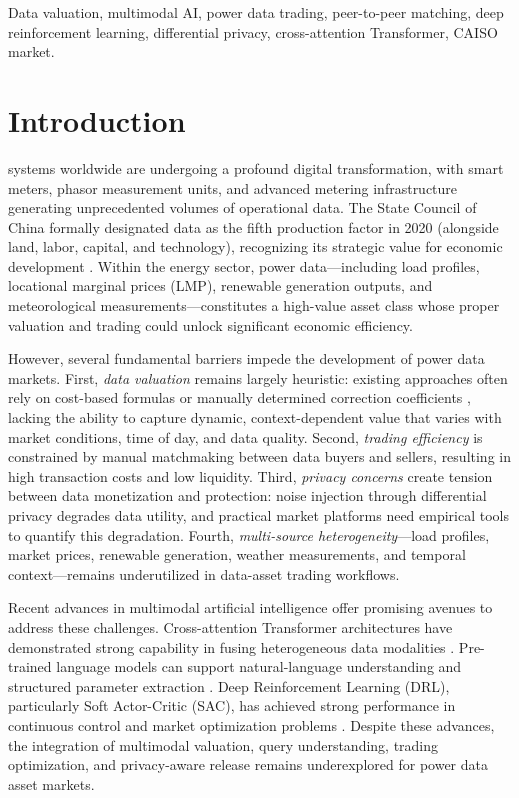 \documentclass{ieeeaccess}
\begin{document}
\begin{keywords}
Data valuation, multimodal AI, power data trading, peer-to-peer matching, deep reinforcement learning, differential privacy, cross-attention Transformer, CAISO market.
\end{keywords}

\titlepgskip=-15pt

\maketitle

\section{Introduction}
\label{sec:introduction}
 systems worldwide are undergoing a profound digital transformation, with smart meters, phasor measurement units, and advanced metering infrastructure generating unprecedented volumes of operational data. The State Council of China formally designated data as the fifth production factor in 2020 (alongside land, labor, capital, and technology), recognizing its strategic value for economic development \cite{b1}. Within the energy sector, power data---including load profiles, locational marginal prices (LMP), renewable generation outputs, and meteorological measurements---constitutes a high-value asset class whose proper valuation and trading could unlock significant economic efficiency.

However, several fundamental barriers impede the development of power data markets. First, \textit{data valuation} remains largely heuristic: existing approaches often rely on cost-based formulas or manually determined correction coefficients \cite{b2}, lacking the ability to capture dynamic, context-dependent value that varies with market conditions, time of day, and data quality. Second, \textit{trading efficiency} is constrained by manual matchmaking between data buyers and sellers, resulting in high transaction costs and low liquidity. Third, \textit{privacy concerns} create tension between data monetization and protection: noise injection through differential privacy degrades data utility, and practical market platforms need empirical tools to quantify this degradation. Fourth, \textit{multi-source heterogeneity}---load profiles, market prices, renewable generation, weather measurements, and temporal context---remains underutilized in data-asset trading workflows.

Recent advances in multimodal artificial intelligence offer promising avenues to address these challenges. Cross-attention Transformer architectures have demonstrated strong capability in fusing heterogeneous data modalities \cite{b3}. Pre-trained language models can support natural-language understanding and structured parameter extraction \cite{b4}. Deep Reinforcement Learning (DRL), particularly Soft Actor-Critic (SAC), has achieved strong performance in continuous control and market optimization problems \cite{b5}. Despite these advances, the integration of multimodal valuation, query understanding, trading optimization, and privacy-aware release remains underexplored for power data asset markets.
\end{document}
